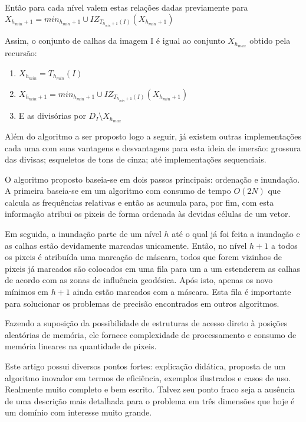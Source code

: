 \documentclass[a4paper,11pt]{report}
\begin{document}
  Então para cada nível valem estas relações dadas previamente para $X_{h_{min} + 1} = min_{h_{min}+1} \cup IZ_{T_{h_{min} + 1}(I)}(X_{h_{min} + 1})$

  Assim, o conjunto de calhas da imagem I é igual ao conjunto $X_{h_{max}}$ obtido pela recursão:

  \begin{enumerate}
    \item $X_{h_{min}} = T_{h_{min}}(I)$
    \item $X_{h_{min} + 1} = min_{h_{min}+1} \cup IZ_{T_{h_{min} + 1}(I)}(X_{h_{min} + 1})$
    \item E as divisórias por $D_I \setminus X_{h_{max}}$
  \end{enumerate}

  Além do algoritmo a ser proposto logo a seguir, já existem outras implementações cada uma com suas vantagens e desvantagens para esta ideia de imersão: grossura das divisas; esqueletos de tons de cinza; até implementações sequenciais.

  O algoritmo proposto baseia-se em dois passos principais: ordenação e inundação. A primeira baseia-se em um algoritmo com consumo de tempo $O(2N)$ que calcula as frequências relativas e então as acumula para, por fim, com esta informação atribui os pixeis de forma ordenada às devidas células de um vetor.

  Em seguida, a inundação parte de um nível $h$ até o qual já foi feita a inundação e as calhas estão devidamente marcadas unicamente. Então, no nível $h + 1$ a todos os pixeis é atribuída uma marcação de máscara, todos que forem vizinhos de pixeis já marcados são colocados em uma fila para um a um estenderem as calhas de acordo com as zonas de influência geodésica. Após isto, apenas os novo mínimos em $h + 1$ ainda estão marcados com a máscara. Esta fila é importante para solucionar os problemas de precisão encontrados em outros algoritmos.

  Fazendo a suposição da possibilidade de estruturas de acesso direto à posições aleatórias de memória, ele fornece complexidade de processamento e consumo de memória lineares na quantidade de pixeis.

  Este artigo possui diversos pontos fortes: explicação didática, proposta de um algoritmo inovador em termos de eficiência, exemplos ilustrados e casos de uso. Realmente muito completo e bem escrito. Talvez seu ponto fraco seja a ausência de uma descrição mais detalhada para o problema em três dimensões que hoje é um domínio com interesse muito grande.
\end{document}
